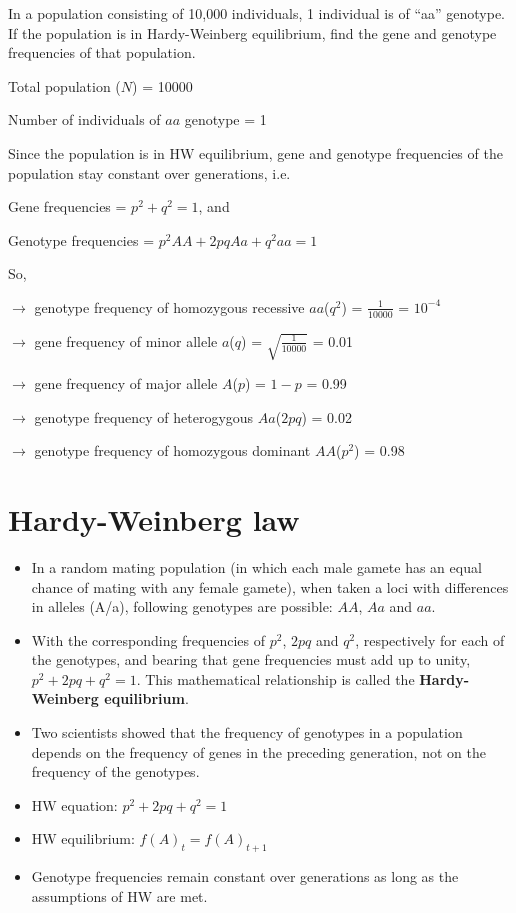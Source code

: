 \documentclass[11pt,dvipsnames,ignorenonframetext,aspectratio=169]{beamer}
\providecommand{\tightlist}{%
  \setlength{\itemsep}{0pt}\setlength{\parskip}{0pt}}
\begin{document}
\begin{frame}{}
\protect\hypertarget{section-13}{}
\scriptsize

In a population consisting of 10,000 individuals, 1 individual is of
``aa'' genotype. If the population is in Hardy-Weinberg equilibrium,
find the gene and genotype frequencies of that population.

Total population (\(N\)) = 10000

Number of individuals of \(aa\) genotype = 1

Since the population is in HW equilibrium, gene and genotype frequencies
of the population stay constant over generations, i.e.

Gene frequencies = \(p^2 + q^2 = 1\), and

Genotype frequencies = \(p^2AA + 2pqAa + q^2aa = 1\)

So,

\(\rightarrow\) genotype frequency of homozygous recessive
\(aa\)(\(q^2\)) = \(\frac{1}{10000}\) = \ensuremath{10^{-4}}

\(\rightarrow\) gene frequency of minor allele \(a\)(\(q\)) =
\(\sqrt{\frac{1}{10000}}\) = 0.01

\(\rightarrow\) gene frequency of major allele \(A\)(\(p\)) = \(1 - p\)
= 0.99

\(\rightarrow\) genotype frequency of heterogygous \(Aa\)(\(2pq\)) =
0.02

\(\rightarrow\) genotype frequency of homozygous dominant
\(AA\)(\(p^2\)) = 0.98
\end{frame}

\hypertarget{hardy-weinberg-law}{%
\section{Hardy-Weinberg law}\label{hardy-weinberg-law}}

\begin{frame}{}
\protect\hypertarget{section-14}{}
\begin{itemize}
\tightlist
\item
  In a random mating population (in which each male gamete has an equal
  chance of mating with any female gamete), when taken a loci with
  differences in alleles (A/a), following genotypes are possible:
  \(AA\), \(Aa\) and \(aa\).
\item
  With the corresponding frequencies of \(p^2\), \(2pq\) and \(q^2\),
  respectively for each of the genotypes, and bearing that gene
  frequencies must add up to unity, \(p^2+2pq+q^2 = 1\). This
  mathematical relationship is called the \textbf{Hardy-Weinberg
  equilibrium}.
\item
  Two scientists showed that the frequency of genotypes in a population
  depends on the frequency of genes in the preceding generation, not on
  the frequency of the genotypes.
\item
  HW equation: \(p^2 + 2pq + q^2 =1\)
\item
  HW equilibrium: \(f(A)_t = f(A)_{t+1}\)
\item
  Genotype frequencies remain constant over generations as long as the
  assumptions of HW are met.
\end{itemize}
\end{frame}
\end{document}
